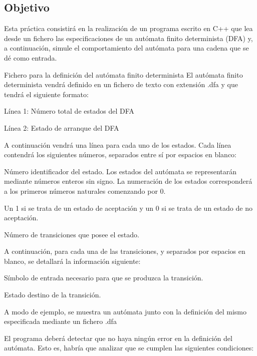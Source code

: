 \subsection*{Objetivo}

Esta práctica consistirá en la realización de un programa escrito en C++ que lea desde un fichero las especificaciones de un autómata finito determinista (D\+FA) y, a continuación, simule el comportamiento del autómata para una cadena que se dé como entrada.

Fichero para la definición del autómata finito determinista El autómata finito determinista vendrá definido en un fichero de texto con extensión .dfa y que tendrá el siguiente formato\+:


\begin{DoxyItemize}
\item Línea 1\+: Número total de estados del D\+FA
\item Línea 2\+: Estado de arranque del D\+FA
\item A continuación vendrá una línea para cada uno de los estados. Cada línea contendrá los siguientes números, separados entre sí por espacios en blanco\+:
\begin{DoxyItemize}
\item Número identificador del estado. Los estados del autómata se representarán mediante números enteros sin signo. La numeración de los estados corresponderá a los primeros números naturales comenzando por 0.
\item Un 1 si se trata de un estado de aceptación y un 0 si se trata de un estado de no aceptación.
\item Número de transiciones que posee el estado.
\item A continuación, para cada una de las transiciones, y separados por espacios en blanco, se detallará la información siguiente\+:
\begin{DoxyItemize}
\item Símbolo de entrada necesario para que se produzca la transición.
\item Estado destino de la transición.
\end{DoxyItemize}
\end{DoxyItemize}
\end{DoxyItemize}

A modo de ejemplo, se muestra un autómata junto con la definición del mismo especificada mediante un fichero .dfa



El programa deberá detectar que no haya ningún error en la definición del autómata. Esto es, habría que analizar que se cumplen las siguientes condiciones\+:


